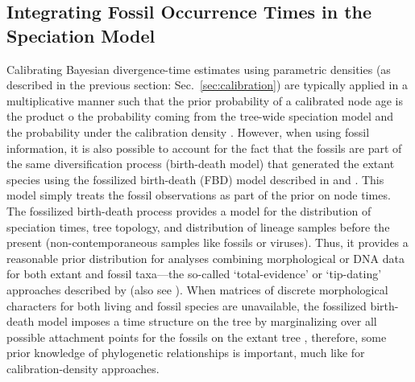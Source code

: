 \subsection{Integrating Fossil Occurrence Times in the Speciation Model}
Calibrating Bayesian divergence-time estimates using parametric densities (as described in the previous section: Sec.~\ref{sec:calibration}) are typically applied in a multiplicative manner such that the prior probability of a calibrated node age is the product o the probability coming from the tree-wide speciation model and the probability under the calibration density \citep{Heled2012,Warnock2012,Warnock2015}. 
However, when using fossil information, it is also possible to account for the fact that the fossils are part of the same diversification process (\IE birth-death model) that generated the extant species using the fossilized birth-death (FBD) model described in \cite{Stadler2010} and \cite{Heath2014}. 
This model simply treats the fossil observations as part of the prior on node times. 
The fossilized birth-death process provides a model for the distribution of speciation times, tree topology, and distribution of lineage samples before the present (\IE non-contemporaneous samples like fossils or viruses). 
Thus, it provides a reasonable prior distribution for analyses combining morphological
or DNA data for both extant and fossil taxa---\IE the so-called `total-evidence' or `tip-dating' approaches described by \cite{Ronquist2012a} (also see \cite{Pyron2011}). 
When matrices of discrete morphological characters for both living and fossil species are unavailable, the fossilized birth-death model imposes a time structure on the tree by marginalizing over all possible attachment points for the fossils on the extant tree \citep{Heath2014}, therefore, some prior knowledge of phylogenetic relationships is important, much like for calibration-density approaches.
